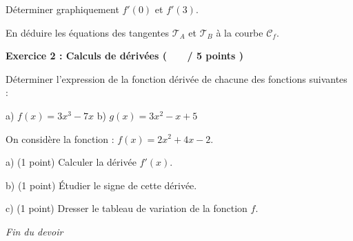 \documentclass[12pt,a4paper]{exam}
\begin{document}
\begin{questions}

\question[2] Déterminer graphiquement $f'(0)$ et $f'(3)$.

\question[3] En déduire les équations des tangentes $\mathcal{T}_A$ et $\mathcal{T}_B$ à 
la courbe $\mathcal{C}_f$.

\end{questions}

\vspace{1cm}

\noindent
\textbf{Exercice 2 : Calculs de dérivées ( \ \ \ / 5 points )}

\vspace{10pt}
\noindent

\begin{questions}

\question[2] Déterminer l'expression de la fonction dérivée de chacune des fonctions suivantes :

\vspace{5pt}
\hspace{1cm}a) $f(x) = 3x^3 - 7x$ \hspace{1cm}b) $g(x) = 3x^2 - x + 5$

\vspace{10pt}

\question On considère la fonction : $f(x) = 2x^2 + 4x - 2$.

\vspace{5pt}
\hspace{1cm}a) (1 point) Calculer la dérivée $f'(x)$.

\vspace{5pt}
\hspace{1cm}b) (1 point) Étudier le signe de cette dérivée.

\vspace{5pt}
\hspace{1cm}c) (1 point) Dresser le tableau de variation de la fonction $f$.

\end{questions}

\vspace{0.5cm}

\begin{center}
    \textit{Fin du devoir}
\end{center}
\end{document}
